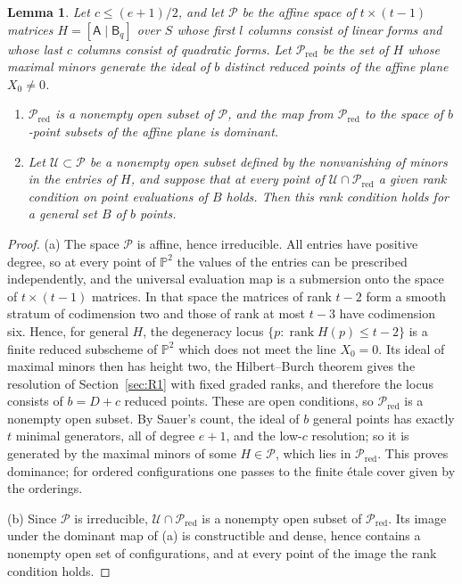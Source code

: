 \documentclass{amsart}
\newtheorem{lemma}[theorem]{Lemma}
\theoremstyle{definition}
\theoremstyle{remark}
\numberwithin{equation}{section}
\newcommand{\PP}{\mathbb{P}}
\DeclareMathOperator{\rank}{rank}
\begin{document}
\begin{lemma}\label{lem:presentation}
Let $c\le(e+1)/2$, and let $\mathcal P$ be the affine space of $t\times(t-1)$ matrices
$H=[\mathsf A\mid\mathsf B_q]$ over $S$ whose first $l$ columns consist of linear forms
and whose last $c$ columns consist of quadratic forms. Let $\mathcal P_{\mathrm{red}}$ be
the set of $H$ whose maximal minors generate the ideal of $b$ distinct reduced points of
the affine plane $X_0\ne0$.
\begin{enumerate}[label=\textup{(\alph*)}]
\item $\mathcal P_{\mathrm{red}}$ is a nonempty open subset of $\mathcal P$, and the map
from $\mathcal P_{\mathrm{red}}$ to the space of $b$-point subsets of the affine plane is
dominant.
\item Let $\mathcal U\subset\mathcal P$ be a nonempty open subset defined by the
nonvanishing of minors in the entries of $H$, and suppose that at every point of
$\mathcal U\cap\mathcal P_{\mathrm{red}}$ a given rank condition on point evaluations of $B$
holds. Then this rank condition holds for a general set $B$ of $b$ points.
\end{enumerate}
\end{lemma}

\begin{proof}
(a) The space $\mathcal P$ is affine, hence irreducible. All entries have positive degree,
so at every point of $\PP^2$ the values of the entries can be prescribed independently, and
the universal evaluation map is a submersion onto the space of $t\times(t-1)$ matrices. In
that space the matrices of rank $t-2$ form a smooth stratum of codimension two and those of
rank at most $t-3$ have codimension six. Hence, for general $H$, the degeneracy locus
$\{p:\rank H(p)\le t-2\}$ is a finite reduced subscheme of $\PP^2$ which does not meet the
line $X_0=0$. Its ideal of maximal minors then has height two, the Hilbert--Burch theorem gives
the resolution of Section~\ref{sec:R1} with fixed graded ranks, and therefore the locus
consists of $b=D+c$ reduced points. These are open conditions, so $\mathcal P_{\mathrm{red}}$
is a nonempty open subset. By Sauer's count, the ideal of $b$ general points has exactly $t$
minimal generators, all of degree $e+1$, and the low-$c$ resolution; so it is generated by
the maximal minors of some $H\in\mathcal P$, which lies in $\mathcal P_{\mathrm{red}}$. This
proves dominance; for ordered configurations one passes to the finite \'etale cover given by
the orderings.

(b) Since $\mathcal P$ is irreducible, $\mathcal U\cap\mathcal P_{\mathrm{red}}$ is a
nonempty open subset of $\mathcal P_{\mathrm{red}}$. Its image under the dominant map of (a)
is constructible and dense, hence contains a nonempty open set of configurations, and at
every point of the image the rank condition holds.
\end{proof}
\end{document}
